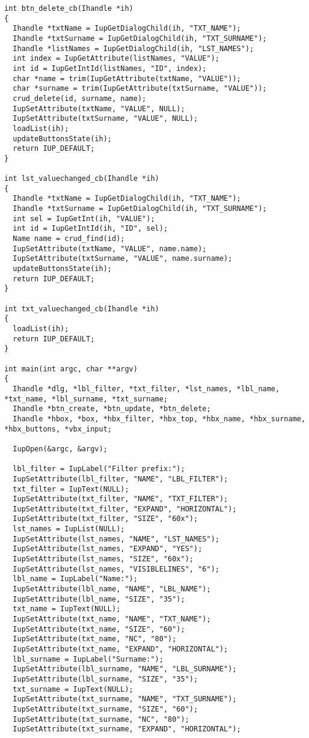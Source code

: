 \documentclass{ctexart}
\begin{document}
\begin{lstlisting}
int btn_delete_cb(Ihandle *ih)
{
  Ihandle *txtName = IupGetDialogChild(ih, "TXT_NAME");
  Ihandle *txtSurname = IupGetDialogChild(ih, "TXT_SURNAME");
  Ihandle *listNames = IupGetDialogChild(ih, "LST_NAMES");
  int index = IupGetAttribute(listNames, "VALUE");
  int id = IupGetIntId(listNames, "ID", index);
  char *name = trim(IupGetAttribute(txtName, "VALUE"));
  char *surname = trim(IupGetAttribute(txtSurname, "VALUE"));
  crud_delete(id, surname, name);
  IupSetAttribute(txtName, "VALUE", NULL);
  IupSetAttribute(txtSurname, "VALUE", NULL);
  loadList(ih);
  updateButtonsState(ih);
  return IUP_DEFAULT;
}

int lst_valuechanged_cb(Ihandle *ih)
{
  Ihandle *txtName = IupGetDialogChild(ih, "TXT_NAME");
  Ihandle *txtSurname = IupGetDialogChild(ih, "TXT_SURNAME");
  int sel = IupGetInt(ih, "VALUE");
  int id = IupGetIntId(ih, "ID", sel);
  Name name = crud_find(id);
  IupSetAttribute(txtName, "VALUE", name.name);
  IupSetAttribute(txtSurname, "VALUE", name.surname);
  updateButtonsState(ih);
  return IUP_DEFAULT;
}

int txt_valuechanged_cb(Ihandle *ih)
{
  loadList(ih);
  return IUP_DEFAULT;
}

int main(int argc, char **argv)
{
  Ihandle *dlg, *lbl_filter, *txt_filter, *lst_names, *lbl_name, *txt_name, *lbl_surname, *txt_surname;
  Ihandle *btn_create, *btn_update, *btn_delete;
  Ihandle *hbox, *box, *hbx_filter, *hbx_top, *hbx_name, *hbx_surname, *hbx_buttons, *vbx_input;

  IupOpen(&argc, &argv);

  lbl_filter = IupLabel("Filter prefix:");
  IupSetAttribute(lbl_filter, "NAME", "LBL_FILTER");
  txt_filter = IupText(NULL);
  IupSetAttribute(txt_filter, "NAME", "TXT_FILTER");
  IupSetAttribute(txt_filter, "EXPAND", "HORIZONTAL");
  IupSetAttribute(txt_filter, "SIZE", "60x");
  lst_names = IupList(NULL);
  IupSetAttribute(lst_names, "NAME", "LST_NAMES");
  IupSetAttribute(lst_names, "EXPAND", "YES");
  IupSetAttribute(lst_names, "SIZE", "60x");
  IupSetAttribute(lst_names, "VISIBLELINES", "6");
  lbl_name = IupLabel("Name:");
  IupSetAttribute(lbl_name, "NAME", "LBL_NAME");
  IupSetAttribute(lbl_name, "SIZE", "35");
  txt_name = IupText(NULL);
  IupSetAttribute(txt_name, "NAME", "TXT_NAME");
  IupSetAttribute(txt_name, "SIZE", "60");
  IupSetAttribute(txt_name, "NC", "80");
  IupSetAttribute(txt_name, "EXPAND", "HORIZONTAL");
  lbl_surname = IupLabel("Surname:");
  IupSetAttribute(lbl_surname, "NAME", "LBL_SURNAME");
  IupSetAttribute(lbl_surname, "SIZE", "35");
  txt_surname = IupText(NULL);
  IupSetAttribute(txt_surname, "NAME", "TXT_SURNAME");
  IupSetAttribute(txt_surname, "SIZE", "60");
  IupSetAttribute(txt_surname, "NC", "80");
  IupSetAttribute(txt_surname, "EXPAND", "HORIZONTAL");


\end{lstlisting}
\end{document}

